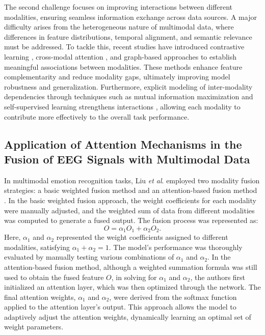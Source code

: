 \documentclass[preprint,12pt]{elsarticle}
\newcommand{\etal}{\textit{et al}. }
\begin{document}
The second challenge focuses on improving interactions between different modalities, ensuring seamless information exchange across data sources. A major difficulty arises from the heterogeneous nature of multimodal data, where differences in feature distributions, temporal alignment, and semantic relevance must be addressed. To tackle this, recent studies have introduced contrastive learning \cite{radford2021learning}, cross-modal attention \cite{rombach2022high}, and graph-based approaches \cite{ding2023mst} to establish meaningful associations between modalities. These methods enhance feature complementarity and reduce modality gaps, ultimately improving model robustness and generalization. Furthermore, explicit modeling of inter-modality dependencies through techniques such as mutual information maximization \cite{cao2024predictive} and self-supervised learning strengthens interactions \cite{wei2023multi}, allowing each modality to contribute more effectively to the overall task performance.

\subsection{Application of Attention Mechanisms in the Fusion of EEG Signals with Multimodal Data}

In multimodal emotion recognition tasks, Liu \etal employed two modality fusion strategies: a basic weighted fusion method and an attention-based fusion method \cite{liu2021comparing}. In the basic weighted fusion approach, the weight coefficients for each modality were manually adjusted, and the weighted sum of data from different modalities was computed to generate a fused output. The fusion process was represented as:
\begin{equation}
     O = \alpha_1O_1+\alpha_2O_2.
\end{equation}
Here, $\alpha_1$ and $\alpha_2$ represented the weight coefficients assigned to different modalities, satisfying $\alpha_1 + \alpha_2 = 1$. The model’s performance was thoroughly evaluated by manually testing various combinations of $\alpha_1$ and $\alpha_2$. In the attention-based fusion method, although a weighted summation formula was still used to obtain the fused feature $O$, in solving for $\alpha_1$ and $\alpha_2$, the authors first initialized an attention layer, which was then optimized through the network. The final attention weights, $\alpha_1$ and $\alpha_2$, were derived from the softmax function applied to the attention layer’s output. This approach allows the model to adaptively adjust the attention weights, dynamically learning an optimal set of weight parameters.
\end{document}
